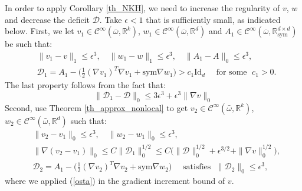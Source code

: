 \documentclass[reqno,twoside,11pt]{amsart}
\newcommand{\sym}{\mathrm{sym}}
\newcommand{\Id}{\mathrm{Id}}
\newcommand{\R}{\mathbb{R}}
\numberwithin{equation}{section}
\theoremstyle{plain}
\theoremstyle{definition}
\begin{document}
In order to apply Corollary \ref{th_NKH}, we need to increase the
regularity of $v$, $w$ and decrease  the deficit $\mathcal{D}$. Take
$\epsilon<1$ that is sufficiently small, as indicated below.
First, we let $v_1\in\mathcal{C}^\infty(\bar\omega,\R^k)$, $w_1\in\mathcal{C}^\infty(\bar\omega,\R^d)$ and 
$A_1\in \mathcal{C}^\infty(\bar\omega,\R^{d\times d}_{\sym})$ be such that:
\begin{equation*}
\begin{split}
&\|v_1- v\|_1\leq \epsilon^3,\quad \|w_1- w\|_1\leq \epsilon^3,\quad
\|A_1- A\|_0\leq \epsilon^3,\\
&\mathcal{D}_1= A_1 -\big(\frac{1}{2}(\nabla v_1)^T\nabla v_1 + \sym\nabla w_1\big)
> c_1\Id_d \quad\mbox{ for some }\; c_1>0.
\end{split}
\end{equation*}
The last property follows from the fact that:
\begin{equation}\label{osta}
\|\mathcal{D}_1-\mathcal{D}\|_0\leq 3\epsilon^3 + \epsilon^3 \|\nabla v\|_0 
\end{equation}
Second, use Theorem \ref{th_approx_nonlocal} to get $v_2\in\mathcal{C}^\infty(\bar\omega,\R^k)$,
$w_2\in\mathcal{C}^\infty(\bar\omega,\R^d)$ such that:
\begin{equation*}
\begin{split}
&\|v_2- v_1\|_0\leq \epsilon^3,\quad \|w_2- w_1\|_0\leq \epsilon^3,\\
& \|\nabla (v_2-v_1)\|_0\leq C\|\mathcal{D}_1\|_0^{1/2}\leq
C\big(\|\mathcal{D}\|_0^{1/2} + \epsilon^{3/2} + \|\nabla v\|_0^{1/2}\big),\\
&\mathcal{D}_2= A_1 -\big(\frac{1}{2}(\nabla v_2)^T\nabla v_2 + \sym\nabla w_2\big)
\quad\mbox{ satisfies }\; \|\mathcal{D}_2\|_0\leq \epsilon^3,
\end{split}
\end{equation*}
where we applied (\ref{osta}) in the gradient increment bound of $v$.

\smallskip
\end{document}
